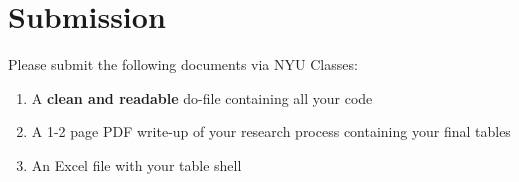 \documentclass{article}
\begin{document}
\section{Submission}

Please submit the following documents via NYU Classes:
\begin{enumerate}
\item A \textbf{clean and readable} do-file containing all your code
\item A 1-2 page PDF write-up of your research process containing your final tables
\item An Excel file with your table shell
\end{enumerate}
\end{document}
